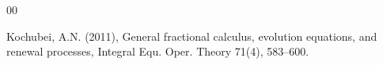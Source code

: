 \documentclass[12pt, twoside, english, headsepline]{article}
\theoremstyle{definition} %
\numberwithin{equation}{section} %
\begin{document}
{\begin{thebibliography}{00}
%
%


Kochubei, A.N. (2011), General fractional calculus, evolution equations, and renewal processes, Integral Equ. Oper. Theory 71(4), 583--600.


\end{thebibliography}}
\end{document}
